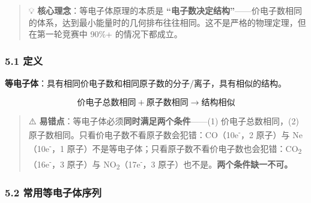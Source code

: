 \documentclass[a4paper,11pt]{ctexart}
\begin{document}
\begin{quote}
💡 \textbf{核心理念}：等电子体原理的本质是 \textbf{``电子数决定结构''}------价电子数相同的体系，达到最小能量时的几何排布往往相同。这不是严格的物理定理，但在第一轮竞赛中 90\%+ 的情况下都成立。
\end{quote}

\subsubsection{5.1 定义}\label{ux5b9aux4e49}

\textbf{等电子体}：具有相同价电子数和相同原子数的分子/离子，具有相似的结构。

\[
\text{价电子总数相同} + \text{原子数相同} \rightarrow \text{结构相似}
\]

\begin{quote}
⚠️ \textbf{易错点}：等电子体必须\textbf{同时满足两个条件}------(1) 价电子总数相同，(2) 原子数相同。只看价电子数不看原子数会犯错：CO（10e\textsuperscript{-}，2 原子）与 Ne（10e\textsuperscript{-}，1 原子）不是等电子体；只看原子数不看价电子数也会犯错：CO\textsubscript{2}（16e\textsuperscript{-}，3 原子）与 NO\textsubscript{2}（17e\textsuperscript{-}，3 原子）也不是。\textbf{两个条件缺一不可。}
\end{quote}

\subsubsection{5.2 常用等电子体序列}\label{ux5e38ux7528ux7b49ux7535ux5b50ux4f53ux5e8fux5217}
\end{document}
